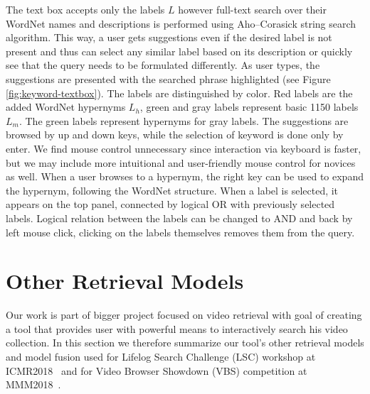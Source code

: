 The text box accepts only the labels $L$ however full-text search over their WordNet names and descriptions is performed using Aho--Corasick string search algorithm. This way, a user gets suggestions even if the desired label is not present and thus can select any similar label based on its description or quickly see that the query needs to be formulated differently. As user types, the suggestions are presented with the searched phrase highlighted (see Figure \ref{fig:keyword-textbox}). The labels are distinguished by color. Red labels are the added WordNet hypernyms $L_h$, green and gray labels represent basic 1150 labels $L_m$. The green labels represent hypernyms for gray labels. The suggestions are browsed by up and down keys, while the selection of keyword is done only by enter. We find mouse control unnecessary since interaction via keyboard is faster, but we may include more intuitional and user-friendly mouse control for novices as well. When a user browses to a hypernym, the right key can be used to expand the hypernym, following the WordNet structure. When a label is selected, it appears on the top panel, connected by logical \textsf{OR} with previously selected labels. Logical relation between the labels can be changed to \textsf{AND} and back by left mouse click, clicking on the labels themselves removes them from the query.

\section{Other Retrieval Models}
Our work is part of bigger project focused on video retrieval with goal of creating a tool that provides user with powerful means to interactively search his video collection. In this section we therefore summarize our tool's other retrieval models and model fusion used for Lifelog Search Challenge (LSC) workshop at ICMR2018~\cite{LokocLSC} and for Video Browser Showdown (VBS) competition at MMM2018~\cite{lokovc2018revisiting}.

